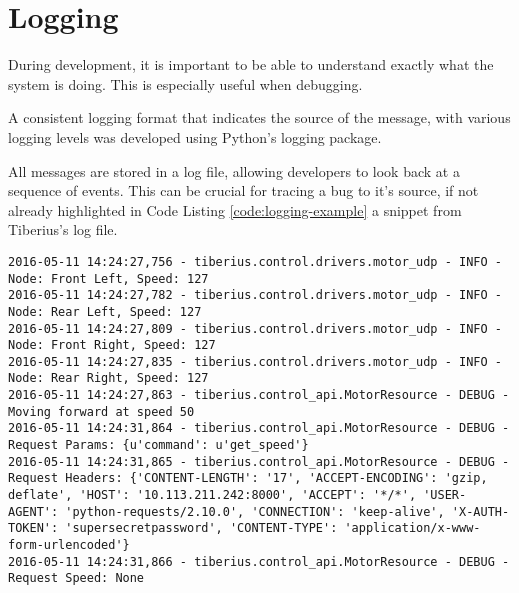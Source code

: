 \section{Logging}
\pagestyle{cameron}

During development, it is important to be able to understand exactly what the system is doing. This is especially useful when debugging. 

A consistent logging format that indicates the source of the message, with various logging levels was developed using Python's logging package.

All messages are stored in a log file, allowing developers to look back at a sequence of events. This can be crucial for tracing a bug to it's source, if not already highlighted in Code Listing \ref{code:logging-example} a snippet from Tiberius's log file. 


\begin{lstlisting}[label=code:logging-example]
2016-05-11 14:24:27,756 - tiberius.control.drivers.motor_udp - INFO - Node: Front Left, Speed: 127
2016-05-11 14:24:27,782 - tiberius.control.drivers.motor_udp - INFO - Node: Rear Left, Speed: 127
2016-05-11 14:24:27,809 - tiberius.control.drivers.motor_udp - INFO - Node: Front Right, Speed: 127
2016-05-11 14:24:27,835 - tiberius.control.drivers.motor_udp - INFO - Node: Rear Right, Speed: 127
2016-05-11 14:24:27,863 - tiberius.control_api.MotorResource - DEBUG - Moving forward at speed 50
2016-05-11 14:24:31,864 - tiberius.control_api.MotorResource - DEBUG - Request Params: {u'command': u'get_speed'}
2016-05-11 14:24:31,865 - tiberius.control_api.MotorResource - DEBUG - Request Headers: {'CONTENT-LENGTH': '17', 'ACCEPT-ENCODING': 'gzip, deflate', 'HOST': '10.113.211.242:8000', 'ACCEPT': '*/*', 'USER-AGENT': 'python-requests/2.10.0', 'CONNECTION': 'keep-alive', 'X-AUTH-TOKEN': 'supersecretpassword', 'CONTENT-TYPE': 'application/x-www-form-urlencoded'}
2016-05-11 14:24:31,866 - tiberius.control_api.MotorResource - DEBUG - Request Speed: None
\end{lstlisting}